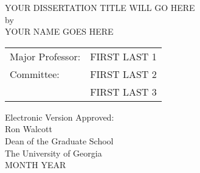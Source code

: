 \documentclass[12pt, notitlepage, twoside]{report}
\begin{document}
\newcommand{\doctitle}{Your Dissertation Title Will Go Here}
\newcommand{\docauthor}{Your Name Goes Here}



%



\newcommand{\degreesearned}{%
\singlespacing{B.S., University of Georgia, 2018\\
  Enter only degrees already completed. Follow example above\\
  If degree was obtained outside of the US, the country \\
  of the school and date obtained will need to be provided.}
}%

\newcommand{\degreetype}{[Dissertation or Thesis]}
\newcommand{\degreetitle}{[Doctor or Master]}
\newcommand{\degreename}{[Degree Name]}
\newcommand{\degreeyear}{YYYY}
\maketitlepage





\newpage
\thispagestyle{empty}
\vspace*{18pt}
\begin{center}
  \MakeUppercase{\doctitle}\\[36pt]
  by\\[36pt]
  \MakeUppercase{\docauthor}
\end{center}
\vfill

\singlespacing\begin{flushright}
  \begin{tabular}{ll}
    Major Professor: & FIRST LAST 1 \\ [24pt]
    Committee: & FIRST LAST 2 \\
    & FIRST LAST 3 \\
  \end{tabular}
\end{flushright}

\vspace*{3cm}

\begin{flushleft}
  Electronic Version Approved:\\[12pt]
  Ron Walcott\\
  Dean of the Graduate School\\
  The University of Georgia\\
  MONTH YEAR
\end{flushleft}
\vspace*{1.5cm}
\end{document}
